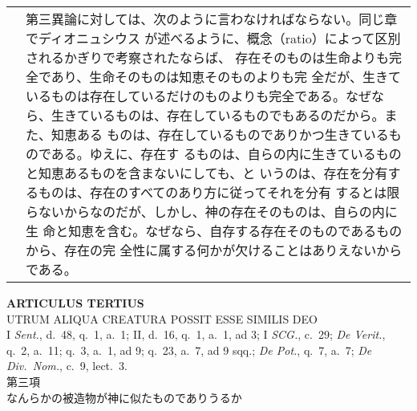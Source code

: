 \documentclass[10pt]{jsarticle} %
\begin{document}
\begin{longtable}{p{21em}p{21em}}
&

第三異論に対しては、次のように言わなければならない。同じ章でディオニュシウス
 が述べるように、概念（ratio）によって区別されるかぎりで考察されたならば、
 存在そのものは生命よりも完全であり、生命そのものは知恵そのものよりも完
 全だが、生きているものは存在しているだけのものよりも完全である。なぜな
 ら、生きているものは、存在しているものでもあるのだから。また、知恵ある
 ものは、存在しているものでありかつ生きているものである。ゆえに、存在す
 るものは、自らの内に生きているものと知恵あるものを含まないにしても、と
 いうのは、存在を分有するものは、存在のすべてのあり方に従ってそれを分有
 するとは限らないからなのだが、しかし、神の存在そのものは、自らの内に生
 命と知恵を含む。なぜなら、自存する存在そのものであるものから、存在の完
 全性に属する何かが欠けることはありえないからである。


\end{longtable}

\newpage
{}

\begin{center}
 {\Large {\bf ARTICULUS TERTIUS}}\\
 {\large UTRUM ALIQUA CREATURA POSSIT ESSE SIMILIS DEO}\\
 {\footnotesize I {\itshape Sent.}, d.~48, q.~1, a.~1; II, d.~16, q.~1,
 a.~1, ad 3; I {\itshape SCG.}, c.~29; {\itshape De Verit.}, q.~2,
 a.~11; q.~3, a.~1, ad 9; q.~23, a.~7, ad 9 sqq.; {\itshape De Pot.},
 q.~7, a.~7; {\itshape De Div.~Nom.}, c.~9, lect.~3.}\\
 {\Large 第三項\\なんらかの被造物が神に似たものでありうるか }
\end{center}
\end{document}
